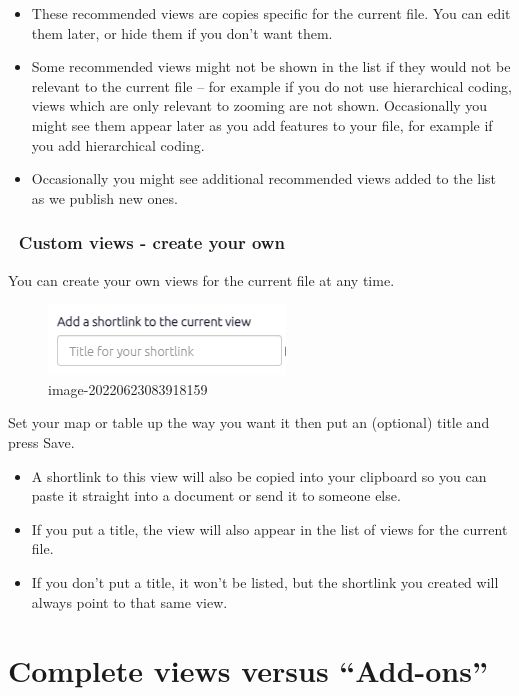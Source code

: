 \documentclass[
]{book}
\providecommand{\tightlist}{%
  \setlength{\itemsep}{0pt}\setlength{\parskip}{0pt}}
\begin{document}
\begin{itemize}
\tightlist
\item
  These recommended views are copies specific for the current file. You can edit them later, or hide them if you don't want them.
\item
  Some recommended views might not be shown in the list if they would not be relevant to the current file -- for example if you do not use hierarchical coding, views which are only relevant to zooming are not shown. Occasionally you might see them appear later as you add features to your file, for example if you add hierarchical coding.
\item
  Occasionally you might see additional recommended views added to the list as we publish new ones.
\end{itemize}

\hypertarget{custom-views---create-your-own}{%
\subsubsection{🤵 Custom views - create your own}\label{custom-views---create-your-own}}

You can create your own views for the current file at any time.

\begin{figure}
\centering
\includegraphics{_assets/image-20220623083918159.png}
\caption{image-20220623083918159}
\end{figure}

Set your map or table up the way you want it then put an (optional) title and press Save.

\begin{itemize}
\tightlist
\item
  A shortlink to this view will also be copied into your clipboard so you can paste it straight into a document or send it to someone else.
\item
  If you put a title, the view will also appear in the list of views for the current file.
\item
  If you don't put a title, it won't be listed, but the shortlink you created will always point to that same view.
\end{itemize}

\hypertarget{complete-views-versus-add-ons}{%
\section{Complete views versus ``Add-ons''}\label{complete-views-versus-add-ons}}
\end{document}
